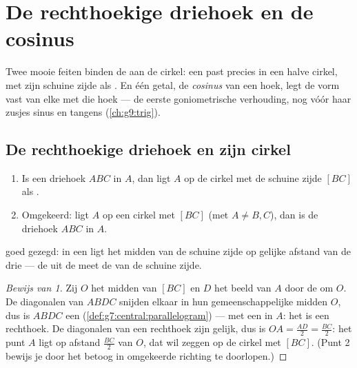 \chapter{De rechthoekige driehoek en de cosinus}\label{ch:g8:cosine}

Twee mooie feiten binden de  aan de cirkel: een
 past precies in een halve cirkel, met zijn schuine zijde
als . En één getal, de \emph{cosinus} van een hoek, legt de vorm vast van
elke  met die hoek --- de eerste goniometrische verhouding,
nog vóór haar zusjes sinus en tangens (\cref{ch:g9:trig}).

\section{De rechthoekige driehoek en zijn cirkel}

\begin{theorem}[Cirkelstelling]\label{thm:g8:cosine:circle}
\begin{enumerate}
  \item Is een driehoek $ABC$  in $A$, dan ligt $A$ op de cirkel met
        de schuine zijde $[BC]$ als .
  \item Omgekeerd: ligt $A$ op een cirkel met  $[BC]$ (met
        $A \neq B, C$), dan is de driehoek $ABC$  in $A$.
\end{enumerate}
 goed gezegd: in een  ligt het midden van de schuine
zijde op gelijke afstand van de drie  --- de  uit de  meet de  van de schuine zijde.
\end{theorem}

\begin{proof}[Bewijs van 1]
Zij $O$ het midden van $[BC]$ en $D$ het beeld van $A$ door de  om
$O$. De diagonalen van $ABDC$ snijden elkaar in hun gemeenschappelijke midden
$O$, dus is $ABDC$ een  (\cref{def:g7:central:parallelogram}) ---
met een  in $A$: het is een rechthoek. De diagonalen van een rechthoek
zijn gelijk, dus is $OA = \frac{AD}{2} = \frac{BC}{2}$: het punt $A$ ligt op
afstand $\frac{BC}{2}$ van $O$, dat wil zeggen op de cirkel met  $[BC]$.
(Punt 2 bewijs je door het betoog in omgekeerde richting te doorlopen.)
\end{proof}

